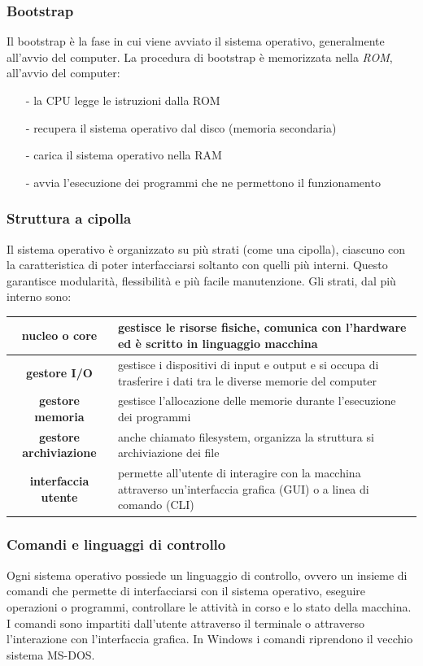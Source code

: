 \documentclass[a4paper]{article}
\begin{document}
\subsubsection*{Bootstrap}
Il bootstrap è la fase in cui viene avviato il sistema operativo, generalmente all'avvio del computer.
La procedura di bootstrap è memorizzata nella \textit{ROM}, all'avvio del computer:
\begin{itemize}[topsep=3pt, itemsep=0pt]
	\item[-] la CPU legge le istruzioni dalla ROM
	\item[-] recupera il sistema operativo dal disco (memoria secondaria)
	\item[-] carica il sistema operativo nella RAM
	\item[-] avvia l'esecuzione dei programmi che ne permettono il funzionamento
\end{itemize}

\subsubsection*{Struttura a cipolla}
Il sistema operativo è organizzato su più strati (come una cipolla), ciascuno con la caratteristica di poter interfacciarsi
soltanto con quelli più interni. Questo garantisce modularità, flessibilità e più facile manutenzione.
Gli strati, dal più interno sono:
\begin{center}
	\begin{tabularx}{\textwidth}{c X}
		\textbf{nucleo o core} & gestisce le risorse fisiche, comunica con l'hardware ed è scritto in linguaggio macchina \\
		\midrule
		\textbf{gestore I/O} & gestisce i dispositivi di input e output e si occupa di trasferire i dati tra le diverse
		memorie del computer \\
		\midrule
		\textbf{gestore memoria} & gestisce l'allocazione delle memorie durante l'esecuzione dei programmi \\
		\midrule
		\textbf{gestore archiviazione} & anche chiamato filesystem, organizza la struttura si archiviazione dei file \\
		\midrule
		\textbf{interfaccia utente} & permette all'utente di interagire con la macchina attraverso un'interfaccia grafica (GUI)
		o a linea di comando (CLI) \\
	\end{tabularx}
\end{center}

\subsubsection*{Comandi e linguaggi di controllo}
Ogni sistema operativo possiede un linguaggio di controllo, ovvero un insieme di comandi che permette di interfacciarsi
con il sistema operativo, eseguire operazioni o programmi, controllare le attività in corso e lo stato della macchina.
I comandi sono impartiti dall'utente attraverso il terminale o attraverso l'interazione con l'interfaccia grafica.
In Windows i comandi riprendono il vecchio sistema MS-DOS.
\end{document}
